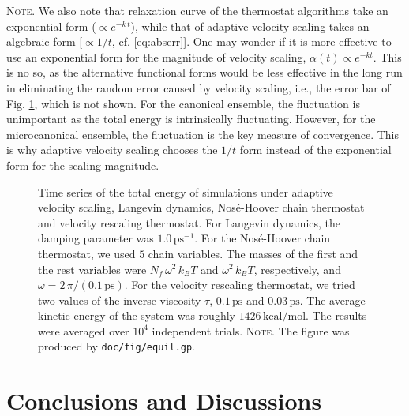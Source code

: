 \documentclass[reprint]{revtex4-1}
\newcommand{\red}[1]{{\color{red} #1}}
\newcommand{\note}[1]{{\color{DarkGreen}\footnotesize \textsc{Note.} #1}}
\begin{document}
\note{
We also note that relaxation curve of the thermostat algorithms
take an exponential form ($\propto e^{-k\,t}$),
while that of adaptive velocity scaling takes
an algebraic form [$\propto 1/t$,
cf. \eqref{eq:abserr}].
%
One may wonder if it is more effective to use an exponential form
for the magnitude of velocity scaling,
$\alpha(t) \propto e^{-kt}$.
%
This is no so, as the alternative functional forms
would be less effective in the long run
in eliminating the random error caused by velocity scaling,
i.e., the error bar of Fig. \ref{fig:equil},
which is not shown.
%
For the canonical ensemble, the fluctuation is unimportant
as the total energy is intrinsically fluctuating.
%
However, for the microcanonical ensemble, the fluctuation
is the key measure of convergence.
%
This is why adaptive velocity scaling chooses the $1/t$ form
instead of the exponential form for the scaling magnitude.
}

\begin{figure}[h]
\begin{center}
  \caption{
    \label{fig:equil}
    Time series of the total energy
    of simulations under
    adaptive velocity scaling,
    Langevin dynamics,
    Nos\'e-Hoover chain thermostat
    and
    velocity rescaling thermostat.
    For Langevin dynamics,
    the damping parameter was $1.0 \, \mathrm{ps}^{-1}$.
    For the Nos\'e-Hoover chain thermostat,
    we used $5$ chain variables. The masses
    of the first and the rest variables
    were $N_f \, \omega^2 \, k_B T$ and
    $\omega^2 \, k_B T$, respectively\cite{martyna1992},
    and
    $\omega = 2 \,\pi/(0.1 \, \mathrm{ps})$.
    For the velocity rescaling thermostat,
    we tried two values of the inverse viscosity $\tau$,
    $0.1 \, \mathrm{ps}$ and $0.03 \, \mathrm{ps}$.
    The average kinetic energy of the system
    was roughly $1426 \, \mathrm{kcal/mol}$.
    The results were averaged over $10^4$ independent trials.
    \note{The figure was produced by \texttt{doc/fig/equil.gp}.
    }%
  }
\end{center}
\end{figure}






\section{\label{sec:conclusion}
Conclusions and Discussions}
\end{document}

